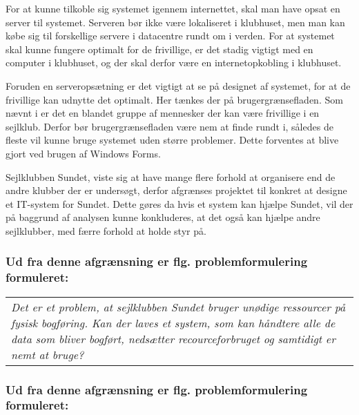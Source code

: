 For at kunne tilkoble sig systemet igennem internettet, skal man have opsat en server til systemet. Serveren
bør ikke være lokaliseret i klubhuset, men man kan købe sig til forskellige servere i datacentre rundt om i
verden. For at systemet skal kunne fungere optimalt for de frivillige, er det stadig vigtigt med en computer i
klubhuset, og der skal derfor være en internetopkobling i klubhuset. 

Foruden en serveropsætning er det vigtigt at se på designet af systemet, for at de frivillige kan udnytte det
optimalt. Her tænkes der på brugergrænsefladen. Som nævnt i 
er det en blandet gruppe af mennesker der kan være frivillige i en sejlklub. Derfor bør brugergrænsefladen
være nem at finde rundt i, således de fleste vil kunne bruge systemet uden større problemer. Dette
forventes at blive gjort ved brugen af Windows Forms.

Sejlklubben Sundet, viste sig at have mange flere forhold at organisere end de andre klubber der er undersøgt,
derfor afgrænses projektet til konkret at designe et IT-system for Sundet. Dette gøres da hvis et system kan
hjælpe Sundet, vil der på baggrund af analysen kunne konkluderes, at det også kan hjælpe andre sejlklubber,
med færre forhold at holde styr på.

\subsubsection*{Ud fra denne afgrænsning er flg. problemformulering formuleret:}

\begin{center}
  \begin{tabular}{|p{14cm}|}
    \textit{Det er et problem, at sejlklubben Sundet bruger unødige ressourcer på fysisk bogføring. Kan der
    laves et system, som kan håndtere alle de data som bliver bogført, nedsætter recourceforbruget og
    samtidigt er nemt at bruge? }
  \end{tabular}
\end{center}

\subsubsection*{Ud fra denne afgrænsning er flg. problemformulering formuleret:}


